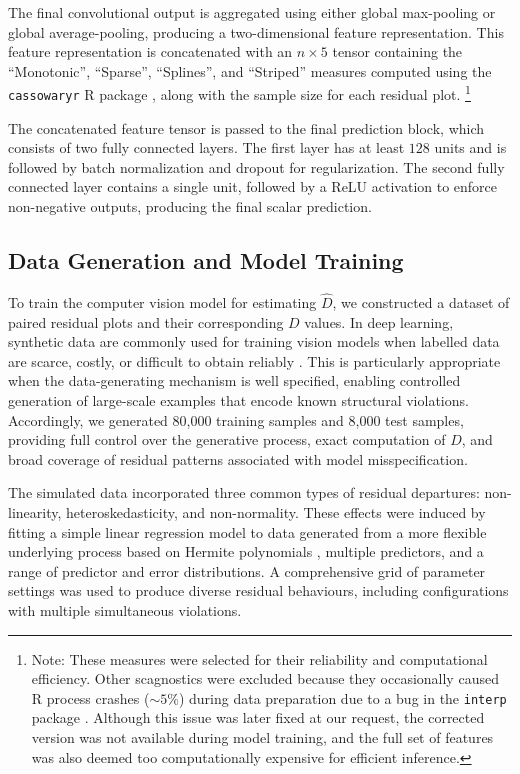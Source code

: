 \documentclass[]{interact}
\theoremstyle{plain}%
\theoremstyle{definition}
\theoremstyle{remark}
\begin{document}
The final convolutional output is aggregated using either global
max-pooling or global average-pooling, producing a two-dimensional
feature representation. This feature representation is concatenated with
an \(n \times 5\) tensor containing the ``Monotonic'', ``Sparse'',
``Splines'', and ``Striped'' measures computed using the
\texttt{cassowaryr} R package \citep{mason2022cassowaryr}, along with
the sample size for each residual plot. \footnote{Note: These measures
  were selected for their reliability and computational efficiency.
  Other scagnostics were excluded because they occasionally caused R
  process crashes (\(\sim 5\%\)) during data preparation due to a bug in
  the \texttt{interp} package \citep{Albrecht2023interp}. Although this
  issue was later fixed at our request, the corrected version was not
  available during model training, and the full set of features was also
  deemed too computationally expensive for efficient inference.}

The concatenated feature tensor is passed to the final prediction block,
which consists of two fully connected layers. The first layer has at
least \(128\) units and is followed by batch normalization and dropout
for regularization. The second fully connected layer contains a single
unit, followed by a ReLU activation to enforce non-negative outputs,
producing the final scalar prediction.

\subsection{Data Generation and Model
Training}\label{sec-model-data-generation}

To train the computer vision model for estimating \(\hat{D}\), we
constructed a dataset of paired residual plots and their corresponding
\(D\) values. In deep learning, synthetic data are commonly used for
training vision models when labelled data are scarce, costly, or
difficult to obtain reliably \citep{nikolenko2021synthetic}. This is
particularly appropriate when the data-generating mechanism is well
specified, enabling controlled generation of large-scale examples that
encode known structural violations. Accordingly, we generated 80,000
training samples and 8,000 test samples, providing full control over the
generative process, exact computation of \(D\), and broad coverage of
residual patterns associated with model misspecification.

The simulated data incorporated three common types of residual
departures: non-linearity, heteroskedasticity, and non-normality. These
effects were induced by fitting a simple linear regression model to data
generated from a more flexible underlying process based on Hermite
polynomials \citep{hermite1864nouveau}, multiple predictors, and a range
of predictor and error distributions. A comprehensive grid of parameter
settings was used to produce diverse residual behaviours, including
configurations with multiple simultaneous violations.
\end{document}
